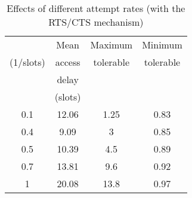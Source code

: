 \documentclass[10pt,twocolumn,oneside,submit]{JCNtran}
\begin{document}
\begin{table}
\caption{Effects of different attempt rates (with the RTS/CTS mechanism)}
\label{tab:tab2}
\begin{center}
{\small \begin{tabular}{|c|c|c|c|}\hline
 & Mean & Maximum & Minimum \\
(1/slots) & access & tolerable & tolerable \\
 & delay &  &  \\
 & (slots) &  &  \\ \hline
0.1 & 12.06 & 1.25 & 0.83 \\
0.4 & 9.09 & 3 & 0.85 \\
0.5 & 10.39 & 4.5 & 0.89 \\
0.7 & 13.81 & 9.6 & 0.92 \\
1 & 20.08 & 13.8 & 0.97 \\ \hline
\end{tabular}}
\end{center}
\end{table}
\end{document}
